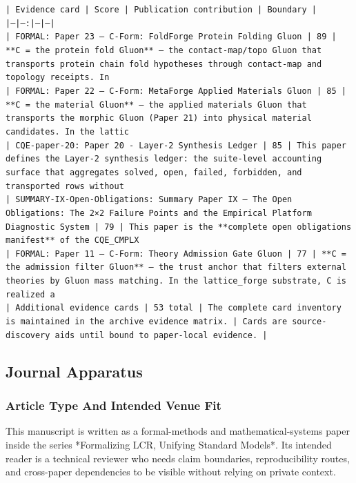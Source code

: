 \documentclass[11pt]{article}
\begin{document}
\noindent\texttt{| Evidence card | Score | Publication contribution | Boundary |}\\
\noindent\texttt{|---|---:|---|---|}\\
\noindent\texttt{| FORMAL: Paper 23 — C-Form: FoldForge Protein Folding Gluon | 89 | **C = the protein fold Gluon** — the contact-map/topo Gluon that transports protein chain fold hypotheses through contact-map and topology receipts. In }\\
\noindent\texttt{| FORMAL: Paper 22 — C-Form: MetaForge Applied Materials Gluon | 85 | **C = the material Gluon** — the applied materials Gluon that transports the morphic Gluon (Paper 21) into physical material candidates. In the lattic}\\
\noindent\texttt{| CQE-paper-20: Paper 20 - Layer-2 Synthesis Ledger | 85 | This paper defines the Layer-2 synthesis ledger: the suite-level accounting surface that aggregates solved, open, failed, forbidden, and transported rows without}\\
\noindent\texttt{| SUMMARY-IX-Open-Obligations: Summary Paper IX — The Open Obligations: The 2×2 Failure Points and the Empirical Platform Diagnostic System | 79 | This paper is the **complete open obligations manifest** of the CQE\_CMPLX}\\
\noindent\texttt{| FORMAL: Paper 11 — C-Form: Theory Admission Gate Gluon | 77 | **C = the admission filter Gluon** — the trust anchor that filters external theories by Gluon mass matching. In the lattice\_forge substrate, C is realized a}\\
\noindent\texttt{| Additional evidence cards | 53 total | The complete card inventory is maintained in the archive evidence matrix. | Cards are source-discovery aids until bound to paper-local evidence. |}\\

\subsection*{Journal Apparatus}

\subsubsection*{Article Type And Intended Venue Fit}

This manuscript is written as a formal-methods and mathematical-systems paper
inside the series *Formalizing LCR, Unifying Standard Models*. Its intended
reader is a technical reviewer who needs claim boundaries, reproducibility
routes, and cross-paper dependencies to be visible without relying on private
context.
\end{document}
